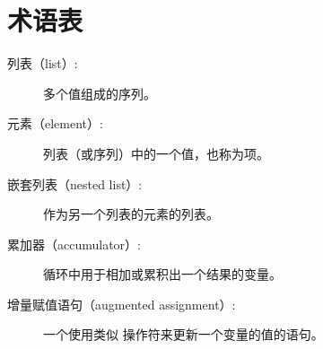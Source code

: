 \section{术语表}

\begin{description}


\item[列表（list）:] 多个值组成的序列。


\item[元素（element）:] 列表（或序列）中的一个值，也称为项。


\item[嵌套列表（nested list）:] 作为另一个列表的元素的列表。


\item[累加器（accumulator）:] 循环中用于相加或累积出一个结果的变量。


\item[增量赋值语句（augmented assignment）:] 一个使用类似 \li{+=} 操作符来更新一个变量的值的语句。
  



\end{description}
